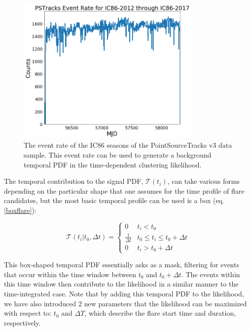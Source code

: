 \begin{figure}[h]
\centering
\includegraphics[width=0.8\textwidth]{figs/evt_rate.png}
\caption{The event rate of the IC86 seasons of the PointSourceTracks v3 data sample. This event rate can be used to generate a background temporal PDF in the time-dependent clustering likelihood.}
\label{fig:evt_rate}
\end{figure}

The temporal contribution to the signal PDF, $\mathcal{T}(t_i)$, can take various forms depending on the particular shape that one assumes for the time profile of flare candidates, but the most basic temporal profile can be used is a box (eq. \ref{boxflare}):

\begin{equation}
    \mathcal{T}(t_i | t_0, \Delta t) = 
    \begin{cases} 
      0 & t_i < t_0 \\
      \frac{1}{\Delta t} & t_0 \leq t_i \leq t_0+\Delta t \\
      0 & t_i > t_0 + \Delta t
   \end{cases}
   \label{boxflare}
\end{equation}

This box-shaped temporal PDF essentially asks as a mask, filtering for events that occur within the time window between $t_0$ and $t_0 + \Delta t$. The events within this time window then contribute to the likelihood in a similar manner to the time-integrated case. Note that by adding this temporal PDF to the likelihood, we have also introduced 2 new parameters that the likelihood can be maximized with respect to: $t_0$ and $\Delta T$, which describe the flare start time and duration, respectively. 

